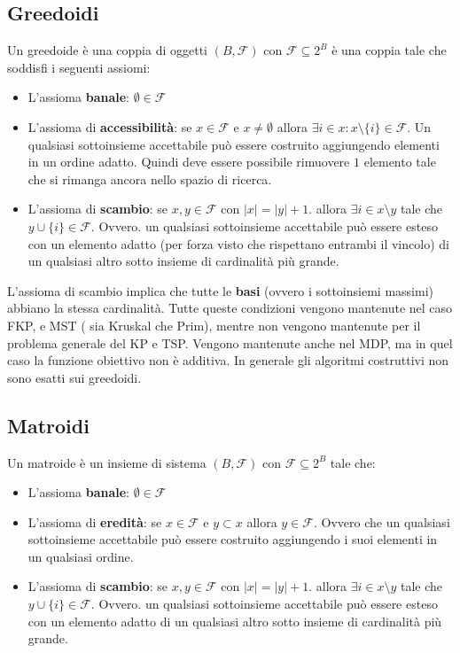 \documentclass{article}
\begin{document}
    \subsection{Greedoidi}
    Un greedoide è una coppia di oggetti $(B,\mathcal{F})$ con
$\mathcal{F}\subseteq 2^B$ è una coppia tale che soddisfi i seguenti assiomi:
    \begin{itemize}
        \item L'assioma \textbf{banale}: $\emptyset\in\mathcal{F}$
        \item L'assioma di \textbf{accessibilità}: se $x\in\mathcal{F}$ e $x\neq\emptyset$ allora
              $\exists i\in x:x\setminus\{i\}\in\mathcal{F}$. Un qualsiasi sottoinsieme accettabile può
              essere costruito aggiungendo elementi in un ordine adatto. Quindi deve essere possibile
              rimuovere $1$ elemento tale che si rimanga ancora nello spazio di ricerca.
        \item L'assioma di \textbf{scambio}: se $x,y\in\mathcal{F}$ con $|x|=|y|+1$. allora $\exists i\in x\setminus y$
              tale che $y\cup\{i\}\in\mathcal{F}$. Ovvero. un qualsiasi sottoinsieme accettabile può
              essere esteso con un elemento adatto (per forza visto che rispettano entrambi il vincolo)
              di un qualsiasi altro sotto insieme di cardinalità più grande.
    \end{itemize}
    L'assioma di scambio implica che tutte le \textbf{basi} (ovvero i sottoinsiemi massimi)
    abbiano la stessa cardinalità. Tutte queste condizioni vengono mantenute nel caso FKP, e MST (
    sia Kruskal che Prim), mentre non vengono mantenute per il problema generale del KP e TSP.
    Vengono mantenute anche nel MDP, ma in quel caso la funzione obiettivo non è additiva. In generale
    gli algoritmi costruttivi non sono esatti sui greedoidi.


    \subsection{Matroidi}
    Un matroide è un insieme di sistema $(B,\mathcal{F})$ con $\mathcal{F}\subseteq 2^B$ tale che:
    \begin{itemize}
        \item L'assioma \textbf{banale}: $\emptyset\in\mathcal{F}$
        \item L'assioma di \textbf{eredità}: se $x\in\mathcal{F}$ e $y\subset x$ allora $y\in\mathcal{F}$. Ovvero
              che un qualsiasi sottoinsieme accettabile può essere costruito aggiungendo i suoi elementi
              in un qualsiasi ordine.
        \item L'assioma di \textbf{scambio}: se $x,y\in\mathcal{F}$ con $|x|=|y|+1$. allora $\exists i\in x\setminus y$
              tale che $y\cup\{i\}\in\mathcal{F}$. Ovvero. un qualsiasi sottoinsieme accettabile può
              essere esteso con un elemento adatto di un qualsiasi altro sotto insieme di cardinalità
              più grande.
    \end{itemize}
\end{document}
